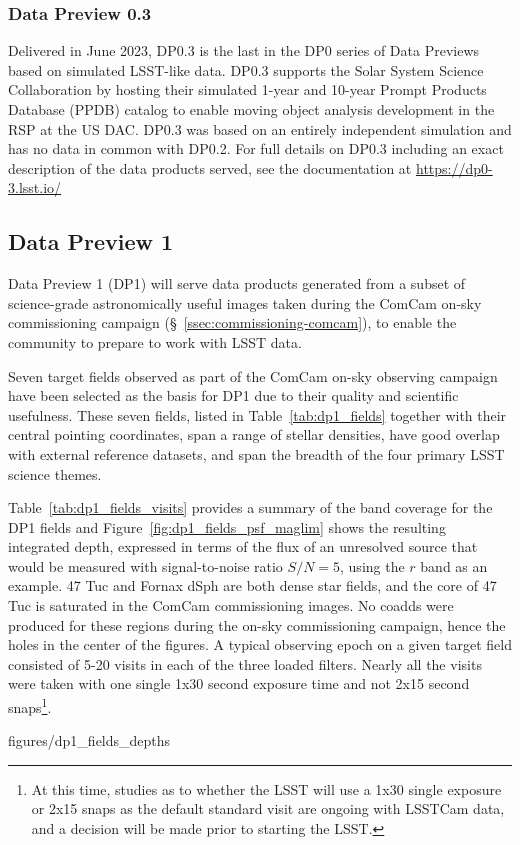 \subsubsection{Data Preview 0.3}
\label{sec:dp03}

Delivered in June  2023, DP0.3 is the last in the DP0 series of Data Previews based on simulated LSST-like data. 
DP0.3 supports the Solar System Science Collaboration by hosting their simulated 1-year and 10-year Prompt Products Database (PPDB) catalog to enable moving object analysis development in the RSP at the US DAC.
DP0.3 was based on an entirely independent simulation and has no data in common with DP0.2.
For full details on DP0.3 including an exact description of the data products served, see the documentation at \url{https://dp0-3.lsst.io/}

\subsection{Data Preview 1}
\label{ssec:dp1}

Data Preview 1 (DP1) will serve data products generated from a subset of science-grade astronomically useful images  taken  during  the ComCam on-sky commissioning campaign (\S~\ref{ssec:commissioning-comcam}), to enable the community to prepare to work with LSST data. 

Seven target fields observed as part of the ComCam on-sky observing campaign  have been selected as the basis for DP1 due to their quality and scientific usefulness.  
These seven fields, listed in Table~\ref{tab:dp1_fields} together with their central pointing coordinates, span a range of stellar densities, have good overlap with external reference datasets, and span the breadth of the four primary LSST science themes.


Table~\ref{tab:dp1_fields_visits} provides a summary of the band coverage for the DP1 fields and Figure~\ref{fig:dp1_fields_psf_maglim} shows the
resulting integrated depth, expressed in terms of the flux of an unresolved source that would be measured with signal-to-noise ratio $S/N = 5$, using the $r$ band as an example.
47 Tuc and Fornax dSph are both dense star fields, and the core of 47 Tuc is saturated in the ComCam commissioning images.
No coadds were produced for these regions during the on-sky commissioning campaign, hence the holes in the center of the figures.
A typical observing epoch on a given target field consisted of 5-20 visits in each of the three loaded filters.
Nearly all the visits  were taken with one single 1x30 second exposure time and not  2x15 second snaps\footnote{At this time, studies as to whether the LSST will use a 1x30 single exposure or 2x15 snaps as the default standard visit are ongoing with LSSTCam data, and a decision will be made prior to starting the LSST. }.

 {figures/dp1_fields_depths}

